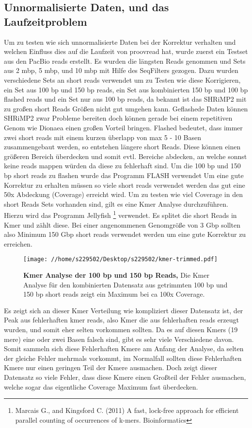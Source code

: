 \documentclass{scrartcl}
\begin{document}
\subsection{Unnormalisierte Daten, und das Laufzeitproblem}
\label{sec-6-3}
Um zu testen wie sich unnormalisierte Daten bei der Korrektur verhalten und welchen Einfluss dies auf die Laufzeit von proovread hat, wurde zuerst ein
Testset aus den PacBio reads erstellt. Es wurden die längsten Reads genommen und Sets aus 2 mbp, 5 mbp, und 10 mbp mit Hilfe des SeqFilters gezogen. 
Dazu wurden verschiedene Sets an short reads verwendet um zu Testen wie diese Korrigieren, ein Set aus 100 bp und 150 bp reads, ein Set aus kombinierten
150 bp und 100 bp flashed reads und ein Set nur aus 100 bp reads, da bekannt ist das SHRiMP2 mit zu großen short Reads Größen nicht gut umgehen kann.
Geflashede Daten können SHRiMP2 zwar Probleme bereiten doch können gerade bei einem repetitiven Genom wie Dionaea einen großen Vorteil bringen. Flashed
bedeutet, dass immer zwei short reads mit einem kurzen überlapp von max 5 - 10 Basen zusammengebaut werden, so entstehen längere short Reads. Diese können 
einen größeren Bereich überdecken und somit evtl. Bereiche abdecken, an welche sonnst keine reads mappen würden da diese zu fehlerhaft sind.
Um die 100 bp und 150 bp short reads zu flashen wurde das Programm FLASH \footnotemark[12]{} verwendet
Um eine gute Korrektur zu erhalten müssen so viele short reads verwendet werden das gut eine 50x Abdeckung (Coverage) erreicht wird. Um zu testen wie viel
Coverage in den short Reads Sets vorhanden sind, gilt es eine Kmer Analyse durchzuführen. Hierzu wird das Programm Jellyfish \footnote{Marcais G., and Kingsford C. (2011)
A fast, lock-free approach for efficient parallel counting of occurrences of k-mers. Bioinformatics

\clearpage} verwendet. Es splitet die 
short Reads in Kmer und zählt diese. Bei einer angenommenen Genomgröße von 3 Gbp sollten also Minimum 150 Gbp short reads verwendet werden um eine 
gute Korrektur zu erreichen. 
\begin{figure}
\texttt{[image: //home/s229502/Desktop/s229502/kmer-trimmed.pdf]}
\caption[Kmer Analyse der 100 bp und 150 bp Reads]{\textbf{Kmer Analyse der 100 bp und 150 bp Reads,} Die Kmer Analyse für den kombinierten Datensatz aus getrimmten 100 bp und 150 bp short reads zeigt ein Maximum bei ca 100x Coverage.}
\end{figure}
Es zeigt sich an dieser Kmer Verteilung wie kompliziert dieser Datensatz ist, der Peak aus fehlerhaften kmer reads, also Kmer die aus fehlerhaften reads 
erzeugt wurden, und somit eher selten vorkommen sollten. Da es auf diesen Kmers (19 mere) eine oder zwei Basen falsch sind, gibt es sehr viele Verschiedene davon. 
Somit sammeln sich diese Fehlerhaften Kmere
am Anfang der Analyse, da selten der gleiche Fehler mehrmals vorkommt, im Normalfall sollten diese Fehlerhaften Kmere nur einen geringen Teil der Kmere ausmachen. 
Doch zeigt dieser Datensatz so viele Fehler, 
dass diese Kmere einen Großteil der Fehler ausmachen, welche sogar das eigentliche Coverage Maximum fast überdecken.
\end{document}
